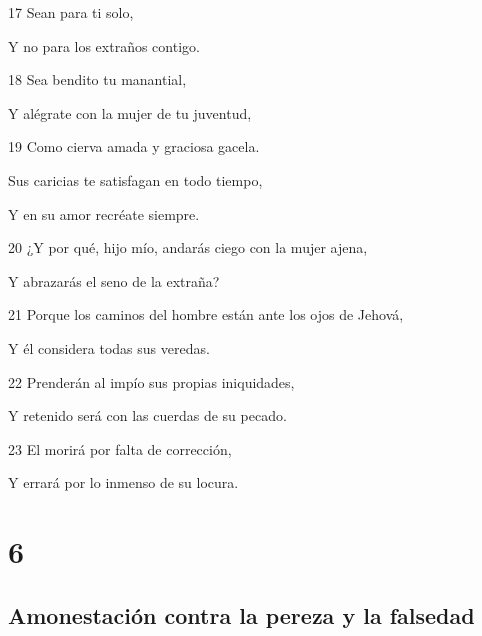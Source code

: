 \par 17 Sean para ti solo,
\par Y no para los extraños contigo.
\par 18 Sea bendito tu manantial,
\par Y alégrate con la mujer de tu juventud,
\par 19 Como cierva amada y graciosa gacela.
\par Sus caricias te satisfagan en todo tiempo,
\par Y en su amor recréate siempre.
\par 20 ¿Y por qué, hijo mío, andarás ciego con la mujer ajena,
\par Y abrazarás el seno de la extraña?
\par 21 Porque los caminos del hombre están ante los ojos de Jehová,
\par Y él considera todas sus veredas.
\par 22 Prenderán al impío sus propias iniquidades,
\par Y retenido será con las cuerdas de su pecado.
\par 23 El morirá por falta de corrección,
\par Y errará por lo inmenso de su locura.

\chapter{6}

\section*{Amonestación contra la pereza y la falsedad}


